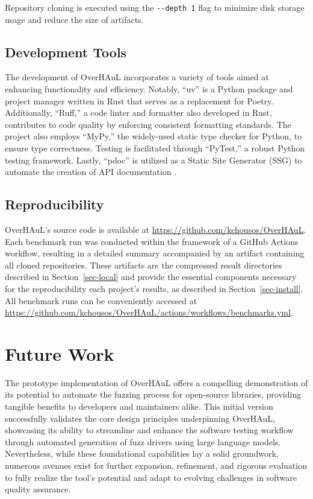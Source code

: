 \documentclass[
  a4paper,
  DIV=11,
  numbers=noendperiod]{scrreprt}
\theoremstyle{definition}
\theoremstyle{remark}
\begin{document}
Repository cloning is executed using the \texttt{-\/-depth\ 1} flag to
minimize disk storage usage and reduce the size of artifacts.

\section{Development Tools}\label{development-tools}

The development of OverHAuL incorporates a variety of tools aimed at
enhancing functionality and efficiency. Notably, ``uv'' is a Python
package and project manager written in Rust that serves as a replacement
for Poetry. Additionally, ``Ruff,'' a code linter and formatter also
developed in Rust, contributes to code quality by enforcing consistent
formatting standards. The project also employs ``MyPy,'' the widely-used
static type checker for Python, to ensure type correctness. Testing is
facilitated through ``PyTest,'' a robust Python testing framework.
Lastly, ``pdoc'' is utilized as a Static Site Generator (SSG) to
automate the creation of API documentation
\autocite{astral2025,astral2025a,cortesi2025,pytestdevteam2025,pythonsoftwarefoundation2025}.

\section{Reproducibility}\label{reproducibility}

OverHAuL's source code is available at
\url{https://github.com/kchousos/OverHAuL}. Each benchmark run was
conducted within the framework of a GitHub Actions workflow, resulting
in a detailed summary accompanied by an artifact containing all cloned
repositories. These artifacts are the compressed result directories
described in Section~\ref{sec-local} and provide the essential
components necessary for the reproducibility each project's results, as
described in Section~\ref{sec-install}. All benchmark runs can be
conveniently accessed at
\url{https://github.com/kchousos/OverHAuL/actions/workflows/benchmarks.yml}.


\chapter{Future Work}\label{future-work}

The prototype implementation of OverHAuL offers a compelling
demonstration of its potential to automate the fuzzing process for
open-source libraries, providing tangible benefits to developers and
maintainers alike. This initial version successfully validates the core
design principles underpinning OverHAuL, showcasing its ability to
streamline and enhance the software testing workflow through automated
generation of fuzz drivers using large language models. Nevertheless,
while these foundational capabilities lay a solid groundwork, numerous
avenues exist for further expansion, refinement, and rigorous evaluation
to fully realize the tool's potential and adapt to evolving challenges
in software quality assurance.
\end{document}

